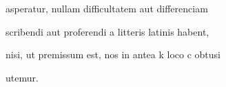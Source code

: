  asperatur, nullam difficultatem aut  differenciam

scribendi aut proferendi a litteris latinis habent,



\fullpreviouslines


{
\color{blue}

nisi, ut premissum est, nos in antea k loco c obtusi

utemur.

}




\endinput



. *8 W rkp.: v. 
ł? W rkp.: singulas.


\catcode `\^^M=5

  \newtip{48}{Łoś niesłusznie uważa, że \textit{bika} w obu wypadkach
    napisano błędnie zamiast \textit{ƀyka}. Przykłady są bowiem podane
    w~pisowni dotychczasowej dla pokazania jej niewystarczalności do
    zróżnicowania wyrazów \textit{bika} i \textit{byka}.}

\obeylines






\newcommand{\margin}[1]{\annotatetextBlue{\{#1\}}{zapisy na marginesie}}



\renewcommand{\over}[1]{\annotatetextBlue{\{#1\}}{zapisy nad rządkami}}

\newcommand{\add}[1]{\annotatetextOlive{<#1>}{litery i wyrazy dodane, (których w tekście brak)}}

\newcommand{\extra}[1]{\colorbox{magenta!10}{[#1]}}

\newcommand{\overstr}[1]{\annotatetextMagenta{⟦#1⟧}{przekreślenia}}



